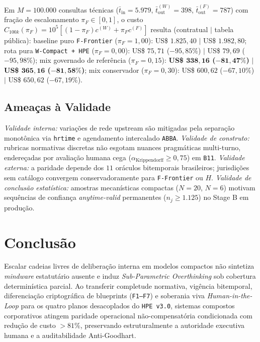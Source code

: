 \documentclass[10pt,twocolumn]{article}
\begin{document}
Em $M=100.000$ consultas t\'ecnicas ($\bar{t}_{\mathrm{in}}=5.979$, $\bar{t}_{\mathrm{out}}^{(W)}=398$, $\bar{t}_{\mathrm{out}}^{(F)}=787$) com fra\c{c}\~ao de escalonamento $\pi_F \in [0,1]$, o custo $C_{100k}(\pi_F) = 10^5[(1-\pi_F)c^{(W)} + \pi_F c^{(F)}]$ resulta (contratual $|$ tabela p\'ublica): baseline puro \texttt{F-Frontier} ($\pi_F=1,00$): US\$ $1.825,40$ $|$ US\$ $1.982,80$; rota pura \texttt{W-Compact + HPE} ($\pi_F=0,00$): US\$ $75,71$ ($-95,85\%$) $|$ US\$ $79,69$ ($-95,98\%$); mix governado de refer\^encia ($\pi_F=0,15$): \textbf{US\$ $\mathbf{338,16}$ ($\mathbf{-81,47\%}$)} $|$ \textbf{US\$ $\mathbf{365,16}$ ($\mathbf{-81,58\%}$)}; mix conservador ($\pi_F=0,30$): US\$ $600,62$ ($-67,10\%$) $|$ US\$ $650,62$ ($-67,19\%$).

\subsection{Amea\c{c}as \`a Validade}

\emph{Validade interna:} varia\c{c}\~oes de rede upstream s\~ao mitigadas pela separa\c{c}\~ao monot\^onica via \texttt{hrtime} e agendamento intercalado \texttt{ABBA}. \emph{Validade de construto:} rubricas normativas discretas n\~ao esgotam nuances pragm\'aticas multi-turno, endere\c{c}adas por avalia\c{c}\~ao humana cega ($\alpha_{\mathrm{Krippendorff}} \ge 0,75$) em \texttt{B11}. \emph{Validade externa:} a paridade depende dos $11$ or\'aculos bitemporais brasileiros; jurisdi\c{c}\~oes sem cat\'alogo convergem conservadoramente para \texttt{F-Frontier} ou $H$. \emph{Validade de conclus\~ao estat\'istica:} amostras mecan\'isticas compactas ($N=20$, $N=6$) motivam sequ\^encias de confian\c{c}a \emph{anytime-valid} permanentes ($n_j \ge 1.125$) no Stage B em produ\c{c}\~ao.

\section{Conclus\~ao}

Escalar cadeias livres de delibera\c{c}\~ao interna em modelos compactos n\~ao sintetiza \emph{mindware} estatut\'ario ausente e induz \emph{Sub-Parametric Overthinking} sob cobertura determin\'istica parcial. Ao transferir completude normativa, vig\^encia bitemporal, diferencia\c{c}\~ao criptogr\'afica de blueprints (\texttt{F1--F7}) e soberania viva \emph{Human-in-the-Loop} para os quatro planos desacoplados do \texttt{HPE v3.0}, sistemas compostos corporativos atingem paridade operacional n\~ao-compensat\'oria condicionada com redu\c{c}\~ao de custo $>81\%$, preservando estruturalmente a autoridade executiva humana e a auditabilidade Anti-Goodhart.
\end{document}
